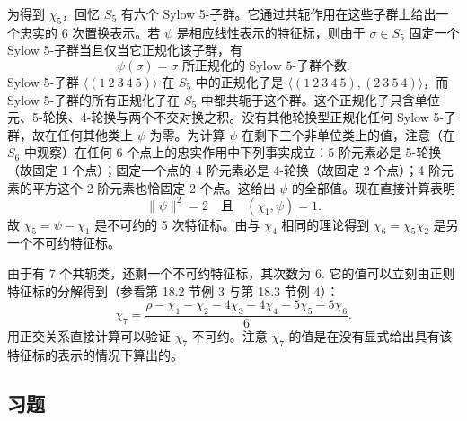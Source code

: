 为得到 \(\chi_5\)，回忆 \(S_5\) 有六个 Sylow 5-子群。它通过共轭作用在这些子群上给出一个忠实的 6 次置换表示。若 \(\psi\) 是相应线性表示的特征标，则由于 \(\sigma \in S_5\) 固定一个 Sylow 5-子群当且仅当它正规化该子群，有
\[
\psi(\sigma) = \sigma \text{ 所正规化的 Sylow 5-子群个数}.
\]
Sylow 5-子群 \(\langle(1\ 2\ 3\ 4\ 5)\rangle\) 在 \(S_5\) 中的正规化子是 \(\langle(1\ 2\ 3\ 4\ 5), (2\ 3\ 5\ 4)\rangle\)，而 Sylow 5-子群的所有正规化子在 \(S_5\) 中都共轭于这个群。这个正规化子只含单位元、5-轮换、4-轮换与两个不交对换之积。没有其他轮换型正规化任何 Sylow 5-子群，故在任何其他类上 \(\psi\) 为零。为计算 \(\psi\) 在剩下三个非单位类上的值，注意（在 \(S_6\) 中观察）在任何 6 个点上的忠实作用中下列事实成立：5 阶元素必是 5-轮换（故固定 1 个点）；固定一个点的 4 阶元素必是 4-轮换（故固定 2 个点）；4 阶元素的平方这个 2 阶元素也恰固定 2 个点。这给出 \(\psi\) 的全部值。现在直接计算表明
\[
\|\psi\|^2 = 2 \quad \text{且} \quad (\chi_1, \psi) = 1.
\]
故 \(\chi_5 = \psi - \chi_1\) 是不可约的 5 次特征标。由与 \(\chi_4\) 相同的理论得到 \(\chi_6 = \chi_5\chi_2\) 是另一个不可约特征标。

由于有 7 个共轭类，还剩一个不可约特征标，其次数为 6. 它的值可以立刻由正则特征标的分解得到（参看第 18.2 节例 3 与第 18.3 节例 4）：
\[
\chi_7 = \frac{\rho - \chi_1 - \chi_2 - 4\chi_3 - 4\chi_4 - 5\chi_5 - 5\chi_6}{6}.
\]
用正交关系直接计算可以验证 \(\chi_7\) 不可约。注意 \(\chi_7\) 的值是在没有显式给出具有该特征标的表示的情况下算出的。

\subsection*{习题}

